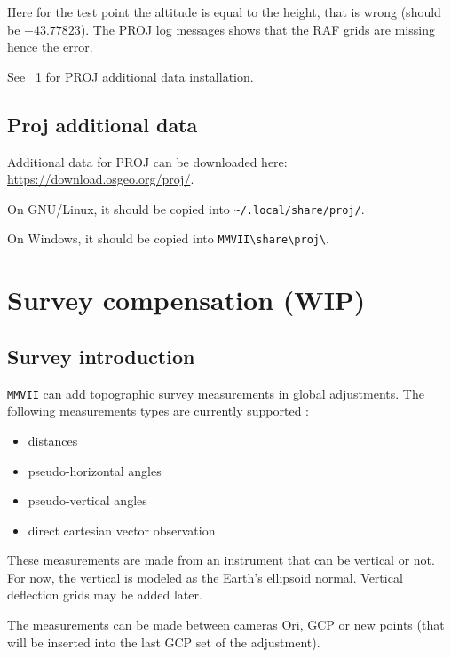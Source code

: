 Here for the test point the altitude is equal to the height, that is wrong (should be  $-43.77823$).
The PROJ log messages shows that the RAF grids are missing hence the error.

See ~\ref{ProjData} for PROJ additional data installation.


\section{Proj additional data}
\label{ProjData}
Additional data for PROJ can be downloaded here: \url{https://download.osgeo.org/proj/}.

On GNU/Linux, it should be copied into {\tt \textasciitilde /.local/share/proj/}.

On Windows, it should be copied into {\tt MMVII\textbackslash share\textbackslash proj\textbackslash}.




\chapter{Survey compensation (WIP)}
\label{Chap:TopoUser}


\section{Survey introduction}

{\tt MMVII} can add topographic survey measurements in global adjustments.
The following measurements types are currently supported :

\begin{itemize}
    \item distances
    \item pseudo-horizontal angles
    \item pseudo-vertical angles
    \item direct cartesian vector observation
\end{itemize}

These measurements are made from an instrument that can be vertical or not.
For now, the vertical is modeled as the Earth's ellipsoid normal. Vertical deflection grids may be added later.

The measurements can be made between cameras Ori, GCP or new points (that will be inserted into the last GCP set of the adjustment).

